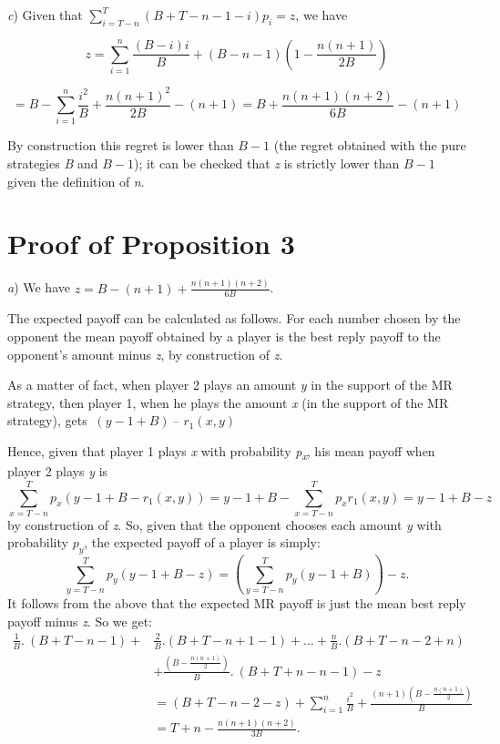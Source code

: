 \begin{Article}
\begin{refsection}[Umbhauer]
\begin{appendices}
\emph{c}) Given that
\(\sum_{i = T - n}^{T}{(B + T - n - 1 - i)p_{i} = z}\), we have

\[z = \sum_{i = 1}^{n}{\frac{(B - i)i}{B} + (B - n - 1)\left( 1 - \frac{n(n + 1)}{2B} \right)}\]

\[= B - \sum_{i = 1}^{n}{\frac{i^{2}}{B} + \frac{n(n + 1)^{2}}{2B} - (n + 1) = B + \frac{n(n + 1)(n + 2)}{6B} - (n + 1)}\]

By construction this regret is lower than \(B - 1\) (the regret obtained
with the pure strategies \emph{B} and \(B - 1\)); it can be checked that
\emph{z} is strictly lower than \(B - 1\) given the definition of
\emph{n}.

\section{Proof of Proposition 3}
\label{Annexe:Proof of Prop 3}

\emph{a}) We have \(z = B - (n + 1) + \frac{n(n + 1)(n + 2)}{6B}\).

The expected payoff can be calculated as follows. For each number chosen
by the opponent the mean payoff obtained by a player is the best reply
payoff to the opponent's amount minus \emph{z}, by construction of
\emph{z}.

As a matter of fact, when player 2 plays an amount \emph{y} in the
support of the MR strategy, then player 1, when he plays the amount
\emph{x} (in the support of the MR strategy), gets \(\ (y - 1 + B)\ –\)
\(r_{1}(x,y)\)

Hence, given that player 1 plays \emph{x} with probability
\emph{p\textsubscript{x}}, his mean payoff when player 2 plays \emph{y}
is
\[\sum_{x = T - n}^{T}{p_{x}(y - 1 + B - r_{1}(x,y))}=y - 1 + B - \sum_{x = T - n}^{T}{p_{x}r_{1}(x,y)} = y - 1 + B - z\]
by construction of \emph{z}. So, given that the opponent chooses each
amount \emph{y} with probability $p_y$, the expected payoff of a
player is simply:
\[
\sum_{y = T - n}^{T}{p_{y}(y - 1 + B - z)} =  \left( \sum_{y = T - n}^{T}{p_{y}(y - 1 + B)} \right) - z.
\]
It follows from the above that the expected MR payoff is just the mean
best reply payoff minus \emph{z}. So we get:
\begin{equation*}
\begin{split}
\frac{1}{B}.\ (B + T - n - 1) +& \frac{2}{B}.(B + T - n + 1 - 1) + \ldots + \frac{n}{B}.(B + T - n - 2 + n)\\
&+ \frac{\left( B - \frac{n(n + 1)}{2} \right)}{B}.\ (B + T + n - n - 1) - z\\
&= (B + T - n - 2 - z) + \sum_{i = 1}^{n} \frac{i^{2}}{B} + \frac{(n + 1)\left( B - \frac{n(n + 1)}{2} \right)}{B}\\
&= T + n - \frac{n(n + 1)(n + 2)}{3B}.
\end{split}
\end{equation*}


\end{appendices}
\end{refsection}
\end{Article}
